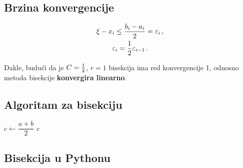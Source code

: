 \subsection{Brzina konvergencije}

\begin{gather*}
    \xi - x_i \leq \frac{b_i-a_i}{2} = \varepsilon_i\,,\\
    \varepsilon_i={1\over 2} \varepsilon_{i-1}\,.
\end{gather*}

Dakle, budući da je $C={1\over 2}$, $r=1$ bisekcija ima red konvergencije 1,
odnosno metoda bisekcije \textbf{konvergira linearno}.

\begin{multicols}{2}
\subsection{Algoritam za bisekciju}
\begin{algorithmic}
    \State $c \gets \dfrac{a + b}{2}$
        \State \Return $c$
    \EndIf
        \State \Return {}
    \Else
        \State \Return {}
    \EndIf
\EndFunction
\end{algorithmic}

\columnbreak

\subsection{Bisekcija u Pythonu}


\end{multicols}
